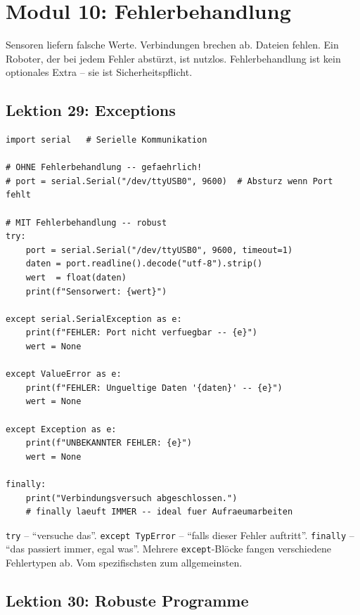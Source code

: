 \chapter{Modul 10: Fehlerbehandlung}

Sensoren liefern falsche Werte. Verbindungen brechen ab. Dateien fehlen. Ein Roboter, der bei jedem Fehler abstürzt, ist nutzlos. Fehlerbehandlung ist kein optionales Extra -- sie ist Sicherheitspflicht.

\section{Lektion 29: Exceptions}

\begin{lstlisting}
import serial   # Serielle Kommunikation

# OHNE Fehlerbehandlung -- gefaehrlich!
# port = serial.Serial("/dev/ttyUSB0", 9600)  # Absturz wenn Port fehlt

# MIT Fehlerbehandlung -- robust
try:
    port = serial.Serial("/dev/ttyUSB0", 9600, timeout=1)
    daten = port.readline().decode("utf-8").strip()
    wert  = float(daten)
    print(f"Sensorwert: {wert}")

except serial.SerialException as e:
    print(f"FEHLER: Port nicht verfuegbar -- {e}")
    wert = None

except ValueError as e:
    print(f"FEHLER: Ungueltige Daten '{daten}' -- {e}")
    wert = None

except Exception as e:
    print(f"UNBEKANNTER FEHLER: {e}")
    wert = None

finally:
    print("Verbindungsversuch abgeschlossen.")
    # finally laeuft IMMER -- ideal fuer Aufraeumarbeiten
\end{lstlisting}

\begin{merksatz}
\texttt{try} -- ``versuche das''. \texttt{except TypError} -- ``falls dieser Fehler auftritt''. \texttt{finally} -- ``das passiert immer, egal was''. Mehrere \texttt{except}-Blöcke fangen verschiedene Fehlertypen ab. Vom spezifischsten zum allgemeinsten.
\end{merksatz}

\section{Lektion 30: Robuste Programme}

